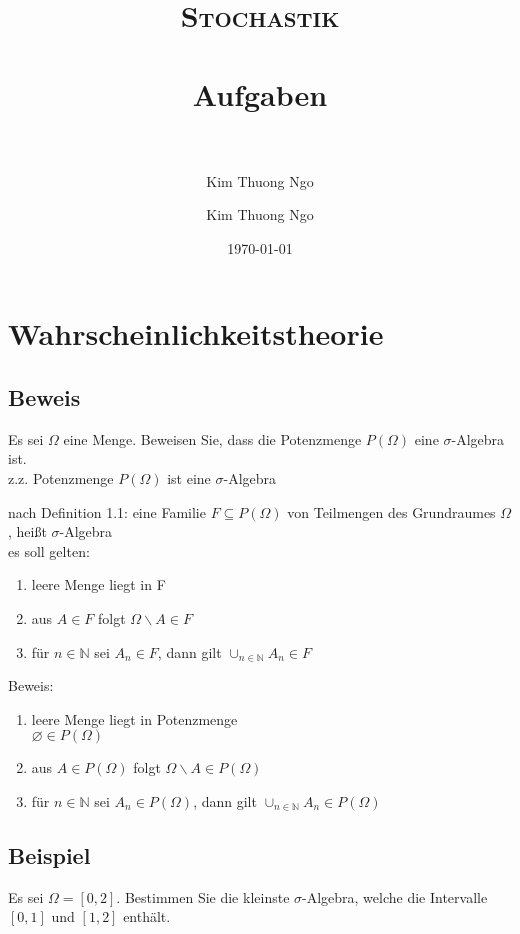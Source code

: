\documentclass[paper=a4, fontsize=11pt]{scrartcl}
\author{Kim Thuong Ngo}
\title{	
\normalfont \normalsize 
\textsc{Stochastik} \\ [25pt] 
\horrule{0.5pt} \\[0.4cm] 
\huge Aufgaben \\ 
\horrule{2pt} \\[0.5cm] 
}
\author{Kim Thuong Ngo}
\date{\normalsize\today}
\numberwithin{equation}{section}
\numberwithin{figure}{section}
\numberwithin{table}{section}
\begin{document}
\maketitle 

\newpage

\tableofcontents

\newpage

\section{Wahrscheinlichkeitstheorie}
\subsection{Beweis}
Es sei $\Omega$ eine Menge. Beweisen Sie, dass die Potenzmenge $P( \Omega)$ eine $ \sigma$-Algebra ist. \\

z.z. Potenzmenge $P( \Omega)$ ist eine $ \sigma$-Algebra

nach Definition 1.1:
eine Familie $F \subseteq P( \Omega)$ von Teilmengen des Grundraumes $ \Omega$, heißt $ \sigma$-Algebra \\
es soll gelten: 
\begin{enumerate}
\item leere Menge liegt in F
\item aus $A \in F$ folgt $ \Omega \backslash A \in F$
\item für $n \in \mathbb{N}$ sei $A_{n} \in F$, dann gilt $\cup_{n \in \mathbb{N}} A_{n} \in F$
\end{enumerate}

Beweis:
\begin{enumerate}
\item leere Menge liegt in Potenzmenge \\
$\varnothing \in P( \Omega)$
\item aus $A \in P( \Omega)$ folgt $ \Omega \backslash A \in P( \Omega)$
\item für $n \in \mathbb{N}$ sei $A_{n} \in P( \Omega)$, dann gilt $\cup_{n \in \mathbb{N}} A_{n} \in P( \Omega)$
\end{enumerate}

\subsection{Beispiel}
Es sei $ \Omega = [0,2]$. Bestimmen Sie die kleinste $ \sigma$-Algebra, welche die Intervalle $[0,1]$ und $[1,2]$ enthält. \\
\end{document}
